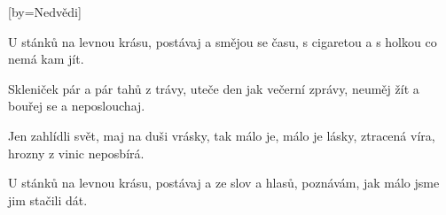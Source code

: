 [by={Nedvědi}]

\beginverse{}
U stánků na levnou krásu,
postávaj a smějou se času,
s cigaretou a s holkou co nemá kam jít.
\endverse{}

\beginverse{}
Skleniček pár a pár tahů z trávy,
uteče den jak večerní zprávy,
neuměj žít a bouřej se a neposlouchaj. 
\endverse{}

\beginchorus{}
Jen zahlídli svět, maj na duši vrásky,
tak málo je, málo je lásky,
ztracená víra, hrozny z vinic neposbírá.
\endchorus{}

\beginverse{}
U stánků na levnou krásu,
postávaj a ze slov a hlasů,
poznávám, jak málo jsme jim stačili dát. 
\endverse{}

\beginchorus{}


\endchorus{}

\endsong{}
